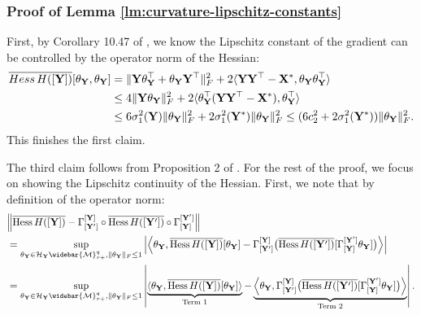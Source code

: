 \documentclass[11pt]{article}
\newcommand{\cH}{\mathcal{H}}
\newcommand{\0}{{\mathbf{0}}}
\newcommand{\1}{{\mathbf{1}}}
\newcommand{\X}{{\mathbf{X}}}
\newcommand{\Y}{{\mathbf{Y}}}
\newcommand{\cM}{{\cal M}}
\newcommand{\Hess}{{\rm Hess}}
\newcommand{\F}{{\rm F}}
\begin{document}
{\subsubsection{Proof of Lemma  \ref{lm:curvature-lipschitz-constants}} \label{proof:sec-app-lemma}
First, by Corollary 10.47 of \cite{boumal2020introduction}, we know the Lipschitz constant of the gradient can be controlled by the operator norm of the Hessian:
\begin{equation*}
	\begin{split}
		\overline{\Hess \, H([\Y])}[\theta_\Y, \theta_\Y] &=\|\Y\theta_\Y^\top + \theta_\Y \Y^\top \|_\F^2 + 2\langle \Y \Y^\top -\X^*, \theta_\Y \theta_\Y^\top \rangle \\
		& \leq 4 \| \Y \theta_{\Y} \|^2_{\F} + 2 \langle \theta_\Y^{\top }( \Y \Y^\top -\X^*), \theta_\Y^\top \rangle \\
		& \leq 6 \sigma^2_1(\Y) \|\theta_{\Y}\|_\F^2 + 2 \sigma^2_1(\Y^*) \|\theta_{\Y}\|_\F^2 \leq  (6 c_2^2 + 2 \sigma^2_1(\Y^*) )\|\theta_{\Y}\|_\F^2.
	\end{split}
\end{equation*} This finishes the first claim.

The third claim follows from Proposition 2 of \cite{massart2019curvature}. For the rest of the proof, we focus on showing the Lipschitz continuity of the Hessian. First, we note that by definition of the operator norm:
\[
\begin{split}
	&\Big\| \overline{\text{Hess}\, H([\mathbf{Y}])} - \Gamma_{[\mathbf{Y'}]}^{[\mathbf{Y}]} \circ \overline{\text{Hess}\, H([\mathbf{Y'}])} \circ \Gamma_{[\mathbf{Y}]}^{[\mathbf{Y'}]} \Big\| \\
	&= \sup_{\theta_{\Y} \in   \cH_\Y\widebar{\cM}_{r+}^{q}, \|\theta_{\Y}\|_{\F} \leq 1} \left| 
 \Big\langle \theta_{\mathbf{Y}}, \overline{\text{Hess}\, H([\mathbf{Y}])}[\theta_{\mathbf{Y}}] - \Gamma_{[\mathbf{Y'}]}^{[\mathbf{Y}]} \big( \overline{\text{Hess}\, H([\mathbf{Y'}])}[\Gamma_{[\mathbf{Y}]}^{[\mathbf{Y'}]} \theta_{\mathbf{Y}}] \big) \Big\rangle \right| \\
& = \sup_{\theta_{\Y} \in   \cH_\Y\widebar{\cM}_{r+}^{q}, \|\theta_{\Y}\|_{\F} \leq 1} \left| 
 \underbrace{\langle \theta_{\mathbf{Y}}, \overline{\text{Hess}\, H([\mathbf{Y}])}[\theta_{\mathbf{Y}}] \rangle}_{\text{Term 1}} - \underbrace{\Big\langle \theta_{\mathbf{Y}}, \Gamma_{[\mathbf{Y'}]}^{[\mathbf{Y}]} \big( \overline{\text{Hess}\, H([\mathbf{Y'}])}[\Gamma_{[\mathbf{Y}]}^{[\mathbf{Y'}]} \theta_{\mathbf{Y}}] \big) \Big\rangle}_{\text{Term 2}} \right|.
\end{split}
\] 

}
\end{document}
